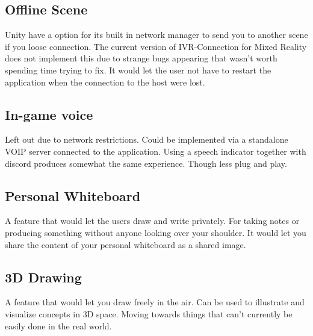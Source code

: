         \subsection{Offline Scene} %
        Unity have a option for its built in network manager to send you to another scene if you loose connection. The current version of IVR-Connection for Mixed Reality does not implement this due to strange bugs appearing that wasn't worth spending time trying to fix. It would let the user not have to restart the application when the connection to the host were lost. %
        
        \subsection{In-game voice} %
        Left out due to network restrictions. Could be implemented via a standalone VOIP server connected to the application. Using a speech indicator together with discord produces somewhat the same experience. Though less plug and play. %
        
        \subsection{Personal Whiteboard}
        A feature that would let the users draw and write privately. For taking notes or producing something without anyone looking over your shoulder. It would let you share the content of your personal whiteboard as a shared image. %
        
        \subsection{3D Drawing}
        A feature that would let you draw freely in the air. Can be used to illustrate and visualize concepts in 3D space. Moving towards things that can't currently be easily done in the real world. %
        